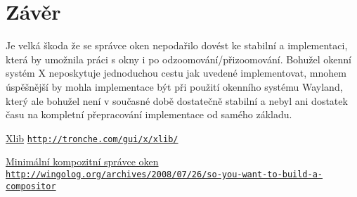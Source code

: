 \documentclass[12pt,a4paper,titlepage,final]{article}
\begin{document}
\section{Závěr} \label{zaver}

Je velká škoda že se správce oken nepodařilo dovést ke stabilní a implementaci, která by umožnila práci s okny
i po odzoomování/přizoomování. Bohužel okenní systém X neposkytuje jednoduchou cestu jak uvedené implementovat,
mnohem úspěšnější by mohla implementace být při použití okenního systému Wayland, který ale bohužel není v současné
době dostatečně stabilní a nebyl ani dostatek času na kompletní přepracování implementace od samého základu.

\begin{thebibliography}{1}

\href{http://tronche.com/gui/x/xlib/}{Xlib} \newline
\href{http://tronche.com/gui/x/xlib/}{\nolinkurl{http://tronche.com/gui/x/xlib/}}

\href{http://wingolog.org/archives/2008/07/26/so-you-want-to-build-a-compositor}{Minimální kompozitní správce oken} \newline
\href{http://wingolog.org/archives/2008/07/26/so-you-want-to-build-a-compositor}{\nolinkurl{http://wingolog.org/archives/2008/07/26/so-you-want-to-build-a-compositor}}

\end{thebibliography}

\end{document}
